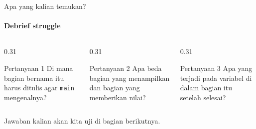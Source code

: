 \documentclass[t]{beamer}
\begin{document}
\begin{frame}{Apa yang kalian temukan?}
\framesubtitle{Debrief struggle}
\begin{columns}[T]
\begin{column}{0.31\textwidth}
\begin{BlokGelap}{Pertanyaan 1}
Di mana bagian bernama itu harus ditulis agar \texttt{main} mengenalnya?
\end{BlokGelap}
\end{column}
\begin{column}{0.31\textwidth}
\begin{BlokGelap}{Pertanyaan 2}
Apa beda bagian yang menampilkan dan bagian yang memberikan nilai?
\end{BlokGelap}
\end{column}
\begin{column}{0.31\textwidth}
\begin{BlokGelap}{Pertanyaan 3}
Apa yang terjadi pada variabel di dalam bagian itu setelah selesai?
\end{BlokGelap}
\end{column}
\end{columns}
\vspace{10pt}
Jawaban kalian akan kita uji di bagian berikutnya.
\end{frame}

\end{document}
